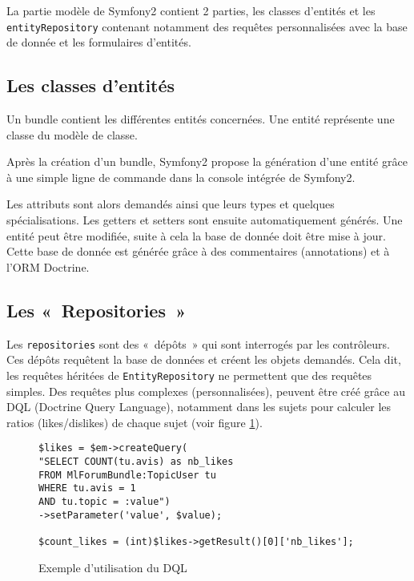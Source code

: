La partie modèle de Symfony2 contient 2 parties, les classes d'entités et les \verb|entityRepository| contenant notamment des requêtes personnalisées avec la base de donnée et les formulaires d'entités.

\subsection{Les classes d'entités}
Un bundle contient les différentes entités concernées. Une entité représente une classe du modèle de classe.

Après la création d'un bundle, Symfony2 propose la génération d'une entité grâce à une simple ligne de commande dans la console intégrée de Symfony2.

Les attributs sont alors demandés ainsi que leurs types et quelques spécialisations. Les getters et setters sont ensuite automatiquement générés. Une entité peut être modifiée, suite à cela la base de donnée doit être mise à jour. Cette base de donnée est générée grâce à des commentaires (annotations) et à l'ORM Doctrine.

\subsection{Les «~Repositories~»}

Les \verb|repositories| sont des «~dépôts~» qui sont interrogés par les contrôleurs. Ces dépôts requêtent la base de données et créent les objets demandés. Cela dit, les requêtes héritées de \verb|EntityRepository| ne permettent que des requêtes simples.
Des requêtes plus complexes (personnalisées), peuvent être créé grâce au DQL (Doctrine Query Language), notamment dans les sujets pour calculer les ratios (likes/dislikes) de chaque sujet (voir figure \ref{fig:dql}).

\begin{figure}[h]
\centering
\begin{lstlisting}
$likes = $em->createQuery(
"SELECT COUNT(tu.avis) as nb_likes
FROM MlForumBundle:TopicUser tu
WHERE tu.avis = 1
AND tu.topic = :value")
->setParameter('value', $value);

$count_likes = (int)$likes->getResult()[0]['nb_likes'];
\end{lstlisting}
\caption{Exemple d'utilisation du DQL}
\label{fig:dql}
\end{figure}


